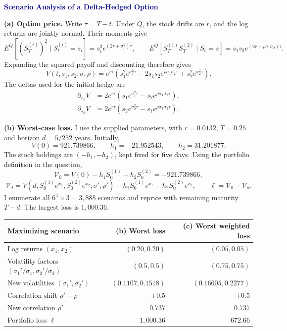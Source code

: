 \documentclass[10pt,letterpaper]{article}
\begin{document}
{\Large\bfseries\textcolor{navy}{Scenario Analysis of a Delta-Hedged Option}}

\textbf{(a) Option price.} Write $\tau=T-t$. Under $Q$, the stock drifts are $r$,
and the log returns are jointly normal. Their moments give
\[
E^Q[(S_T^{(i)})^2\mid S_t^{(i)}=s_i]=s_i^2e^{(2r+\sigma_i^2)\tau},\qquad
E^Q[S_T^{(1)}S_T^{(2)}\mid S_t=s]=s_1s_2e^{(2r+\rho\sigma_1\sigma_2)\tau}.
\]
Expanding the squared payoff and discounting therefore gives
\[
\boxed{V(t,s_1,s_2;\sigma,\rho)=e^{r\tau}
\left(s_1^2e^{\sigma_1^2\tau}-2s_1s_2e^{\rho\sigma_1\sigma_2\tau}
+s_2^2e^{\sigma_2^2\tau}\right).}
\]
The deltas used for the initial hedge are
\[
\begin{aligned}
\partial_{s_1}V&=2e^{r\tau}\left(s_1e^{\sigma_1^2\tau}-s_2e^{\rho\sigma_1\sigma_2\tau}\right),\\
\partial_{s_2}V&=2e^{r\tau}\left(s_2e^{\sigma_2^2\tau}-s_1e^{\rho\sigma_1\sigma_2\tau}\right).
\end{aligned}
\]

\textbf{(b) Worst-case loss.} I use the supplied parameters, with
$r=0.0132$, $T=0.25$ and horizon $d=5/252$ years.
Initially,
\[
V(0)=921.739866,\qquad h_1=-21.952543,\qquad h_2=31.201877.
\]
The stock holdings are $(-h_1,-h_2)$, kept fixed for five days.
Using the portfolio definition in the question,
\[
\mathcal V_0=V(0)-h_1S_0^{(1)}-h_2S_0^{(2)}=-921.739866,
\]
\[
\mathcal V_d=V(d,S_0^{(1)}e^{x_1},S_0^{(2)}e^{x_2};\sigma',\rho')
-h_1S_0^{(1)}e^{x_1}-h_2S_0^{(2)}e^{x_2},\qquad
\ell=\mathcal V_0-\mathcal V_d.
\]
I enumerate all $6^4\times3=3{,}888$ scenarios and reprice with remaining
maturity $T-d$. The largest loss is $\boxed{1{,}000.36}$.

\begin{center}
\begin{tabular}{lrr}\toprule
Maximizing scenario & (b) Worst loss & (c) Worst weighted loss\\\midrule
Log returns $(x_1,x_2)$ & $(0.20,0.20)$ & $(0.05,0.05)$\\
Volatility factors $(\sigma_1'/\sigma_1,\sigma_2'/\sigma_2)$ & $(0.5,0.5)$ & $(0.75,0.75)$\\
New volatilities $(\sigma_1',\sigma_2')$ & $(0.1107,0.1518)$ & $(0.16605,0.2277)$\\
Correlation shift $\rho'-\rho$ & $+0.5$ & $+0.5$\\
New correlation $\rho'$ & $0.737$ & $0.737$\\
Portfolio loss $\ell$ & $1{,}000.36$ & $672.66$\\\bottomrule
\end{tabular}
\end{center}
\end{document}
